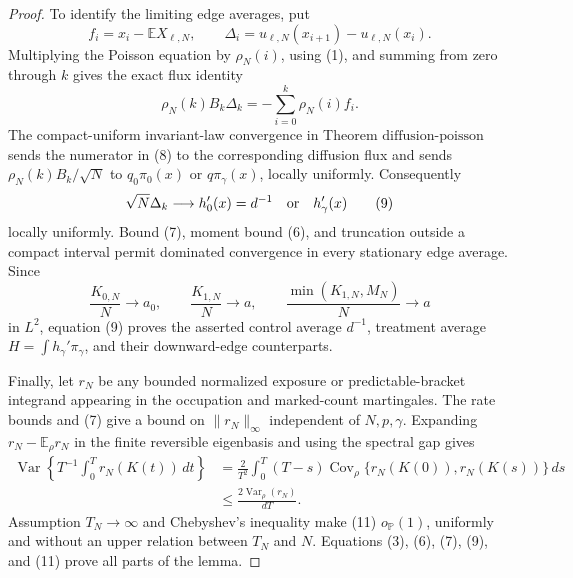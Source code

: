 \documentclass{article}
\begin{document}
\begin{proof}
To identify the limiting edge averages, put
\[
 f_i=x_i-\mathbb E X_{\ell,N},
 \qquad
 \Delta_i=u_{\ell,N}(x_{i+1})-u_{\ell,N}(x_i).
\]
Multiplying the Poisson equation by \(\rho_N(i)\), using (1), and summing from zero through \(k\) gives the exact flux identity
\[
 \rho_N(k)B_k\Delta_k=-\sum_{i=0}^k\rho_N(i)f_i.              \tag{8}
\]
The compact-uniform invariant-law convergence in Theorem \(\mathrm{diffusion\mbox{-}poisson}\) sends the numerator in (8) to the corresponding diffusion flux and sends \(\rho_N(k)B_k/\sqrt N\) to \(q_0\pi_0(x)\) or \(q\pi_\gamma(x)\), locally uniformly.  Consequently
\[
 \sqrt N\Delta_k\longrightarrow h_0'(x)=d^{-1}
 \quad\hbox{or}\quad h_\gamma'(x)                            \tag{9}
\]
locally uniformly.  Bound (7), moment bound (6), and truncation outside a compact interval permit dominated convergence in every stationary edge average.  Since
\[
 \frac{K_{0,N}}N\to a_0,
 \qquad \frac{K_{1,N}}N\to a,
 \qquad \frac{\min(K_{1,N},M_N)}N\to a                       \tag{10}
\]
in \(L^2\), equation (9) proves the asserted control average \(d^{-1}\), treatment average \(H=\int h_\gamma'\pi_\gamma\), and their downward-edge counterparts.

Finally, let \(r_N\) be any bounded normalized exposure or predictable-bracket integrand appearing in the occupation and marked-count martingales.  The rate bounds and (7) give a bound on \(\|r_N\|_\infty\) independent of \(N,p,\gamma\).  Expanding \(r_N-\mathbb E_\rho r_N\) in the finite reversible eigenbasis and using the spectral gap gives
\[
 \begin{split}
 \operatorname{Var}\!\left\{T^{-1}\int_0^T r_N(K(t))\,dt\right\}
 &=\frac2{T^2}\int_0^T(T-s)
   \operatorname{Cov}_\rho\{r_N(K(0)),r_N(K(s))\}\,ds\\
 &\leq\frac{2\operatorname{Var}_\rho(r_N)}{dT}.               \tag{11}
 \end{split}
\]
Assumption \(T_N\to\infty\) and Chebyshev's inequality make (11) \(o_{\mathbb P}(1)\), uniformly and without an upper relation between \(T_N\) and \(N\).  Equations (3), (6), (7), (9), and (11) prove all parts of the lemma.
\end{proof}
\end{document}
